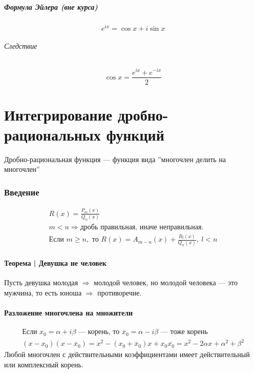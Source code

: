 \documentclass{article}
\begin{document}
\subsubsection{Формула Эйлера (вне курса)}
\[
    e^{ix} = \cos x + i\sin x
\]
\paragraph{Следствие}
\[
    \cos x = \frac{e^{ix} + e^{-ix}}{2}
\]




\newpage
\part{Интегрирование дробно-рациональных функций}
Дробно-рациональная функция --- функция вида ''многочлен делить на многочлен''

\section{Введение}
\begin{gather*}
    R(x) = \frac{P_m(x)}{Q_n(x)} \\
    m < n \Rightarrow \text{дробь правильная, иначе неправильная}. \\
    \text{Если } m \ge n, \text{ то } R(x) = A_{m-n}(x) + \frac{B_l(x)}{Q_n(x)}, ~l < n
\end{gather*}


\subsection{Теорема | Девушка не человек}
Пусть девушка молодая $\Rightarrow$ молодой человек, но молодой человека --- это мужчина, то есть юноша $\Rightarrow$ противоречие.

\subsection{Разложение многочлена на множители}
\begin{gather*}
    \text{Если } x_0 = \alpha + i \beta \text{ --- корень, то } \overline{x}_0 = \alpha - i\beta \text{ --- тоже корень} \\
    (x - x_0)(x - \overline{x}_0) = x^2 - (x_0 + \overline{x}_0)x + x_0\overline{x_0} = x^2 - 2\alpha x + \alpha^2 + \beta^2
\end{gather*}
Любой многочлен с действительными коэффициентами имеет действительный или комплексный корень.
\end{document}

